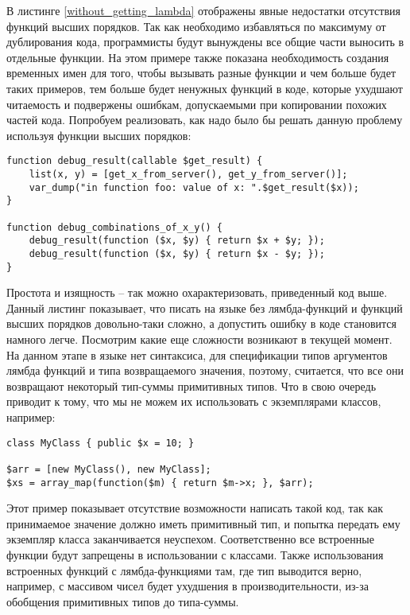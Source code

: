 В листинге \ref{without_getting_lambda} отображены явные недостатки отсутствия функций высших порядков.
Так как необходимо избавляться по максимуму от дублирования кода, программисты будут вынуждены все общие части выносить в отдельные функции.
На этом примере также показана необходимость создания временных имен для того, чтобы вызывать разные функции и чем больше будет таких примеров, тем больше будет ненужных функций в коде, которые ухудшают читаемость и подвержены ошибкам, допускаемыми при копировании похожих частей кода.
Попробуем реализовать, как надо было бы решать данную проблему используя функции высших порядков:
\begin{lstlisting}
function debug_result(callable $get_result) {
	list(x, y) = [get_x_from_server(), get_y_from_server()];
	var_dump("in function foo: value of x: ".$get_result($x));
}

function debug_combinations_of_x_y() {
	debug_result(function ($x, $y) { return $x + $y; });
	debug_result(function ($x, $y) { return $x - $y; });
}
\end{lstlisting}

Простота и изящность -- так можно охарактеризовать, приведенный код выше.
Данный листинг показывает, что писать на языке без лямбда-функций и функций высших порядков довольно-таки сложно, а допустить ошибку в коде становится намного легче.
Посмотрим какие еще сложности возникают в текущей момент.
На данном этапе в языке нет синтаксиса, для спецификации типов аргументов лямбда функций и типа возвращаемого значения, поэтому, считается, что все они возвращают некоторый тип-суммы примитивных типов.
Что в свою очередь приводит к тому, что мы не можем их использовать с экземплярами классов, например:
\begin{lstlisting}
class MyClass { public $x = 10; }

$arr = [new MyClass(), new MyClass];
$xs = array_map(function($m) { return $m->x; }, $arr);
\end{lstlisting}

Этот пример показывает отсутствие возможности написать такой код, так как принимаемое значение должно иметь примитивный тип, и попытка передать ему экземпляр класса заканчивается неуспехом.
Соответственно все встроенные функции будут запрещены в использовании с классами.
Также использования встроенных функций с лямбда-функциями там, где тип выводится верно, например, с массивом чисел будет ухудшения в производительности, из-за обобщения примитивных типов до типа-суммы.
\finishrelatedwork

